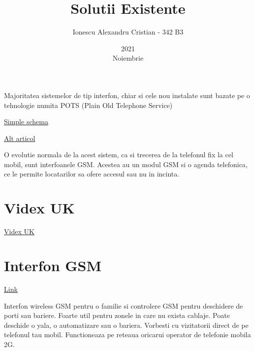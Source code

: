 \documentclass[12pt,english]{article}
\title{Solutii Existente}
\date{2021\\ Noiembrie}
\author{Ionescu Alexandru Cristian - 342 B3}
\begin{document}
\maketitle
\newpage

\tableofcontents
\newpage

Majoritatea sistemelor de tip interfon, chiar si cele nou instalate sunt bazate pe o tehnologie numita POTS (Plain Old Telephone Service)

\href{https://www.epanorama.net/documents/telecom/telephone_intercom.html}{Simple schema}

\begin{center}
\end{center}

\href{https://www.nextiva.com/blog/what-is-pots.html}{Alt articol}

O evolutie normala de la acest sistem, ca si trecerea de la telefonul fix la cel mobil, sunt interfoanele GSM. Acestea au un modul GSM si o agenda telefonica, ce le permite locatarilor sa ofere accesul sau nu in incinta.

\section {Videx UK}

\href{https://www.videxuk.com/system/gsm-intercoms/}{Videx UK}

\section {Interfon GSM}

\href{https://www.a2t.ro/interfoane-videointerfoane/interfon-wireless-gsm-pentru-o-familie.html}{Link}

Interfon wireless GSM pentru o familie si controlere GSM pentru deschidere de porti sau bariere. Foarte util pentru zonele in care nu exista cablaje. Poate deschide o yala, o automatizare sau o bariera. Vorbesti cu vizitatorii direct de pe telefonul tau mobil. Functioneaza pe reteaua oricarui operator de telefonie mobila 2G.
\end{document}
